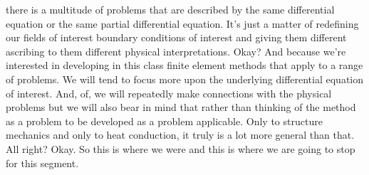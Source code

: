 \documentclass[10pt]{article}
\begin{document}
there is a multitude of problems that are described by the same differential equation or the same partial differential equation. It's just a matter of redefining our fields of interest boundary conditions of interest and giving them different ascribing to them different physical interpretations. Okay? And because we're interested in developing in this class finite element methods that apply to a range of problems. We will tend to focus more upon the underlying differential equation of interest. And, of, we will repeatedly make connections with the physical problems but we will also bear in mind that rather than thinking of the method as a problem to be developed as a problem applicable. Only to structure mechanics and only to heat conduction, it truly is a lot more general than that. All right? Okay. So this is where we were and this is where we are going to stop for this segment.
\end{document}
